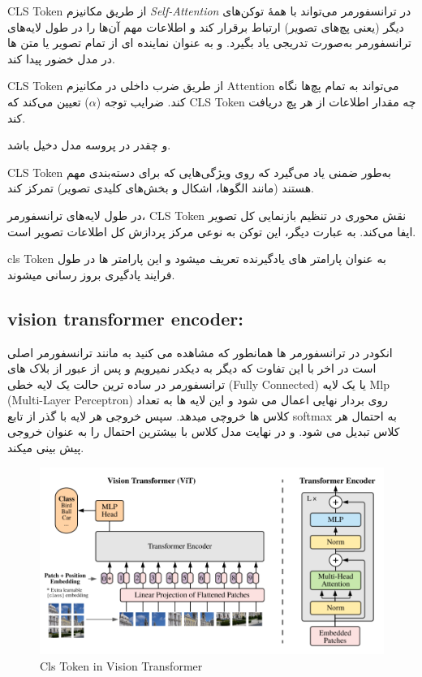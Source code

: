 CLS Token 
از طریق مکانیزم \textit{Self-Attention} در ترانسفورمر می‌تواند با همهٔ توکن‌های دیگر (یعنی پچ‌های تصویر) ارتباط برقرار کند و اطلاعات مهم آن‌ها را در طول لایه‌های ترانسفورمر به‌صورت تدریجی یاد بگیرد. و به عنوان نماینده ای از تمام تصویر یا متن ها در مدل خضور پیدا کند.

     CLS Token از طریق ضرب داخلی در مکانیزم Attention می‌تواند به تمام پچ‌ها نگاه کند. ضرایب توجه ($\alpha$) تعیین می‌کند که CLS Token چه مقدار اطلاعات از هر پچ دریافت کند.

و چقدر در پروسه مدل دخیل باشد.

     CLS Token به‌طور ضمنی یاد می‌گیرد که روی ویژگی‌هایی که برای دسته‌بندی مهم هستند (مانند الگوها، اشکال و بخش‌های کلیدی تصویر) تمرکز کند.


    در طول لایه‌های ترانسفورمر، CLS Token نقش محوری در تنظیم بازنمایی کل تصویر ایفا می‌کند. به عبارت دیگر، این توکن به نوعی مرکز پردازش کل اطلاعات تصویر است.
    
    

   cls Token 
   به عنوان پارامتر های یادگیرنده تعریف میشود و این پارامتر ها در طول فرایند یادگیری بروز رسانی میشوند.
   
   \subsection{vision transformer encoder:}
   
  
  انکودر در ترانسفورمر ها همانطور که مشاهده می کنید به مانند ترانسفورمر  اصلی است در اخر با این تفاوت که دیگر به دیکدر نمیرویم و پس از عبور از بلاک های ترانسفورمر در ساده ترین حالت یک لایه خطی (Fully Connected) یا یک لایه Mlp (Multi-Layer Perceptron)
   روی بردار نهایی اعمال می شود و این لایه ها به تعداد کلاس ها خروچی میدهد.
   سپس خروجی هر لایه با گذر از تابع softmax  به احتمال هر کلاس تبدیل می شود.
   و در نهایت مدل کلاس با بیشترین احتمال را به عنوان خروجی پیش بینی میکند.
   
   
   
       \begin{figure}[h]
   	\centering
   	\begin{minipage}[b]{0.9\textwidth}
   		\centering
   		\includegraphics[width=\textwidth]{transformer_images/vision_transformer_after_embedding.png}
   		\caption{Cls Token in Vision Transformer}
   		\label{fig:Cls Token In Vision Transformer}
   	\end{minipage}
   	\hfill
   	
   \end{figure}
   
